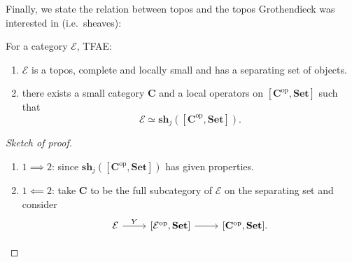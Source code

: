 \documentclass[a4paper]{article}
\renewcommand{\c}[1]{\mathbf{#1}}
\newcommand{\Set}{{\c{Set}}}
\newcommand{\sh}{{\c{sh}}}
\begin{document}
Finally, we state the relation between topos and the topos Grothendieck was interested in (i.e.\ sheaves):

\begin{theorem}
  For a category \(\mathcal E\), TFAE:
  \begin{enumerate}
  \item \(\mathcal E\) is a topos, complete and locally small and has a separating set of objects.
  \item there exists a small category \(\c C\) and a local operators on \([\c C^{\text{op}}, \Set]\) such that
    \[
      \mathcal E \simeq \sh_j([\c C^{\text{op}}, \Set]).
    \]
  \end{enumerate}
\end{theorem}

\begin{proof}[Sketch of proof]\leavevmode
  \begin{enumerate}
  \item \(1 \implies 2\): since \(\sh_j([\c C^{\text{op}}, \Set])\) has given properties.
  \item \(1 \impliedby 2\): take \(\c C\) to be the full subcategory of \(\mathcal E\) on the separating set and consider
    \[
      \begin{tikzcd}
        \mathcal E \ar[r, "Y"] & {[\mathcal E^{\text{op}}, \Set]} \ar[r] & {[\c C^{\text{op}}, \Set]}.
      \end{tikzcd}
    \]
  \end{enumerate}
\end{proof}

\printindex
\end{document}
